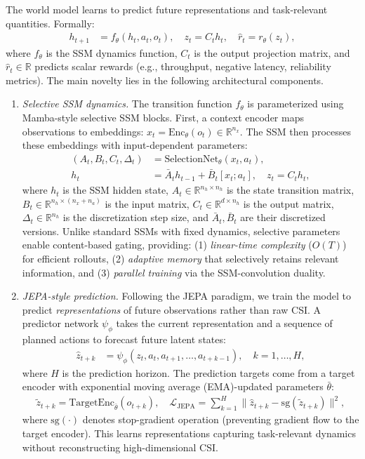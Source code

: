 \documentclass[11pt,a4paper]{article}
\begin{document}
The world model learns to predict future representations and task-relevant quantities. Formally:
\begin{align}
h_{t+1} &= f_\theta(h_t, a_t, o_t), \quad z_t = C_t h_t, \quad \hat{r}_t = r_\theta(z_t),
\end{align}
where $f_\theta$ is the SSM dynamics function, $C_t$ is the output projection matrix, and $\hat{r}_t \in \mathbb{R}$ predicts scalar rewards (e.g., throughput, negative latency, reliability metrics). The main novelty lies in the following architectural components.

\begin{enumerate}
    \item \textit{Selective SSM dynamics.} The transition function $f_\theta$ is parameterized using Mamba-style selective SSM blocks. First, a context encoder maps observations to embeddings: $x_t = \text{Enc}_\theta(o_t) \in \mathbb{R}^{n_x}$. The SSM then processes these embeddings with input-dependent parameters:
    \begin{align}
        (A_t, B_t, C_t, \Delta_t) &= \text{SelectionNet}_\theta(x_t, a_t), \\
        h_t &= \bar{A}_t h_{t-1} + \bar{B}_t [x_t; a_t], \quad z_t = C_t h_t,
    \end{align}
    where $h_t$ is the SSM hidden state, $A_t \in \mathbb{R}^{n_h \times n_h}$ is the state transition matrix, $B_t \in \mathbb{R}^{n_h \times (n_x + n_a)}$ is the input matrix, $C_t \in \mathbb{R}^{d \times n_h}$ is the output matrix, $\Delta_t \in \mathbb{R}^{n_h}$ is the discretization step size, and $\bar{A}_t, \bar{B}_t$ are their discretized versions. Unlike standard SSMs with fixed dynamics, selective parameters enable content-based gating, providing: (1) \emph{linear-time complexity} ($O(T)$) for efficient rollouts, (2) \emph{adaptive memory} that selectively retains relevant information, and (3) \emph{parallel training} via the SSM-convolution duality.

    \item \textit{JEPA-style prediction.} Following the JEPA paradigm, we train the model to predict \emph{representations} of future observations rather than raw CSI. A predictor network $\psi_\phi$ takes the current representation and a sequence of planned actions to forecast future latent states:
    \begin{align}
        \hat{z}_{t+k} &= \psi_\phi(z_t, a_t, a_{t+1}, \ldots, a_{t+k-1}), \quad k = 1, \ldots, H,
    \end{align}
    where $H$ is the prediction horizon. The prediction targets come from a target encoder with exponential moving average (EMA)-updated parameters $\bar{\theta}$:
    \begin{align}
        \tilde{z}_{t+k} = \text{TargetEnc}_{\bar{\theta}}(o_{t+k}), \quad \mathcal{L}_{\text{JEPA}} = \sum_{k=1}^{H} \| \hat{z}_{t+k} - \text{sg}(\tilde{z}_{t+k}) \|^2,
    \end{align}
    where $\text{sg}(\cdot)$ denotes stop-gradient operation (preventing gradient flow to the target encoder). This learns representations capturing task-relevant dynamics without reconstructing high-dimensional CSI.


\end{enumerate}
\end{document}

